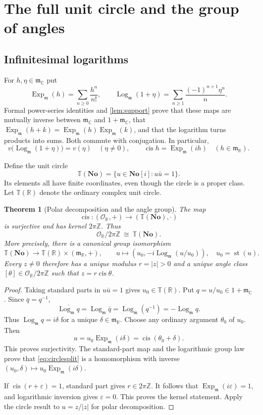 \documentclass[11pt]{article}
\numberwithin{equation}{section}
\newtheorem{theorem}{Theorem}[section]
\theoremstyle{definition}
\newcommand{\No}{\mathbf{No}}
\newcommand{\SC}{\mathbf{No}[i]}
\newcommand{\R}{\mathbb R}
\newcommand{\C}{\mathbb C}
\newcommand{\Z}{\mathbb Z}
\newcommand{\OO}{\mathcal O}
\newcommand{\mm}{\mathfrak m}
\newcommand{\TT}{\mathbb T}
\newcommand{\eps}{\varepsilon}
\newcommand{\st}{\operatorname{st}}
\newcommand{\cis}{\operatorname{cis}}
\newcommand{\Ex}{\operatorname{Exp}_{\mm}}
\newcommand{\Logm}{\operatorname{Log}_{\mm}}
\begin{document}
\section{The full unit circle and the group of angles}\label{sec:circle}
\subsection{Infinitesimal logarithms}
For $h,\eta\in\mm_{\C}$ put
\begin{equation}\label{eq:explog}
 \Ex(h)=\sum_{n\ge0}\frac{h^n}{n!},\qquad
 \Logm(1+\eta)=\sum_{n\ge1}\frac{(-1)^{n+1}\eta^n}{n}.
\end{equation}
Formal power-series identities and \cref{lem:support} prove that these maps are mutually inverse between $\mm_{\C}$ and $1+\mm_{\C}$, that $\Ex(h+k)=\Ex(h)\Ex(k)$, and that the logarithm turns products into sums. Both commute with conjugation. In particular,
\begin{equation}\label{eq:logleading}
 v\bigl(\Logm(1+\eta)\bigr)=v(\eta)
 \quad(\eta\ne0),\qquad \cis h=\Ex(ih)\quad(h\in\mm_{\R}).
\end{equation}

Define the unit circle
\[
 \TT(\No)=\{u\in\SC:u\bar u=1\}.
\]
Its elements all have finite coordinates, even though the circle is a proper class. Let $\TT(\R)$ denote the ordinary complex unit circle.

\begin{theorem}[Polar decomposition and the angle group]\label{thm:polar}
The map
\[
 \cis:(\OO_{\R},+)\longrightarrow(\TT(\No),\cdot)
\]
is surjective and has kernel $2\pi\Z$. Thus
\begin{equation}\label{eq:anglegroup}
 \OO_{\R}/2\pi\Z\ \cong\ \TT(\No).
\end{equation}
More precisely, there is a canonical group isomorphism
\begin{equation}\label{eq:circlesplit}
 \TT(\No)\longrightarrow\TT(\R)\times(\mm_{\R},+),\qquad
 u\longmapsto\left(u_0,-i\Logm(u/u_0)\right),\quad u_0=\st(u).
\end{equation}
Every $z\ne0$ therefore has a unique modulus $r=|z|>0$ and a unique angle class $[\theta]\in\OO_{\R}/2\pi\Z$ such that $z=r\cis\theta$.
\end{theorem}
\begin{proof}
Taking standard parts in $u\bar u=1$ gives $u_0\in\TT(\R)$. Put $q=u/u_0\in1+\mm_{\C}$. Since $\bar q=q^{-1}$,
\[
 \overline{\Logm q}=\Logm\bar q=\Logm(q^{-1})=-\Logm q.
\]
Thus $\Logm q=i\delta$ for a unique $\delta\in\mm_{\R}$. Choose any ordinary argument $\theta_0$ of $u_0$. Then
\[
 u=u_0\Ex(i\delta)=\cis(\theta_0+\delta).
\]
This proves surjectivity. The standard-part map and the logarithmic group law prove that \eqref{eq:circlesplit} is a homomorphism with inverse $(u_0,\delta)\mapsto u_0\Ex(i\delta)$.

If $\cis(r+\eps)=1$, standard part gives $r\in2\pi\Z$. It follows that $\Ex(i\eps)=1$, and logarithmic inversion gives $\eps=0$. This proves the kernel statement. Apply the circle result to $u=z/|z|$ for polar decomposition.
\end{proof}
\end{document}
